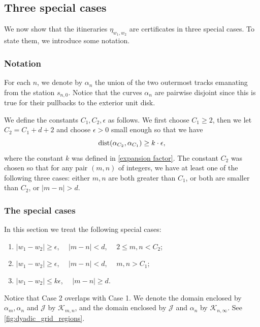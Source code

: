 \subsection{Three special cases}

We now show that the itineraries $\eta_{w_1,w_2}$ are certificates in three special cases. To state them, we introduce some notation.

\subsubsection{Notation} \label{sec:notation}

For each $n$, we denote by  $\alpha_n$ the union of the two outermost tracks emanating from the station $s_{n,0}$. 
Notice that the curves $\alpha_n$ are pairwise disjoint since this is true for their pullbacks to the exterior unit disk.

We define the constants $C_1, C_2, \epsilon$ as follows. We first choose $C_1 \ge 2$, then we let $C_2 = C_1 + d+2$ and choose $\epsilon >0$ small enough so that we have 
\begin{equation}
	\operatorname{dist}(\alpha_{C_2}, \alpha_{C_1}) \geq k \cdot \epsilon,
\end{equation}
where the constant $k$ was defined in \cref{expansion factor}.
The constant $C_2$ was chosen so that for any pair $(m,n)$ of integers, we have at least one of the following three cases: either $m,n$ are both greater than $C_1$, or both are smaller than $C_2$, or $|m-n| > d$.

\subsubsection{The special cases}
In this section we treat the following special cases:
\begin{enumerate}
	\item $|w_1-w_2| \geq  \epsilon$, $\quad |m-n|<d$, $\quad 2 \le m,n < C_2$; %
	\item $|w_1-w_2| \geq \epsilon$, $\quad |m-n|<d$, $\quad  m,n> C_1$; %
	\item $|w_1-w_2| \leq k \epsilon$, $\quad |m-n| \geq d$.
\end{enumerate}

Notice that Case 2 overlaps with Case 1.
 We denote the domain enclosed by $\alpha_m, \alpha_n$ and $\mathcal J$ by $\mathcal K_{m,n}$, and the domain enclosed by $\mathcal J$ and $\alpha_n$ by $\mathcal K_{n,\infty}$. See \cref{fig:dyadic_grid_regions}.

